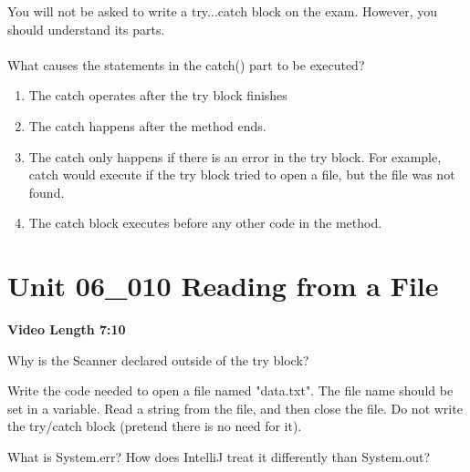 \documentclass[letterpaper,12pt]{exam}
\newcommand{\unit}{Unit 06}
\begin{document}
\begin{questions}
\begin{samepage}
    \question You will not be asked to write a try{}...catch{} block on the exam.  However, you should understand its parts.\\
    \\What causes the statements in the catch(){} part to be executed?
    \begin{enumerate}
        \item The catch operates after the try block finishes
        \vspace{5mm}
        \item The catch happens after the method ends.
        \vspace{5mm}
        \item The catch only happens if there is an error in the try{} block.  For example, catch would execute if the try block tried to open a file, but the file was not found.
        \vspace{5mm}
        \item The catch block executes before any other code in the method.
        \vspace{5mm}
       \end{enumerate}
\end{samepage}

\section*{\unit\_010 Reading from a File} %
\noindent \textbf{Video Length 7:10 }


\begin{samepage}
    \question Why is the Scanner declared outside of the try{} block?
    \vspace{5mm}
\end{samepage}

\begin{samepage}
    \question Write the code needed to open a file named "data.txt".  The file name should be set in a variable.  Read a string from the file, and then close the file.  Do not write the try/catch block (pretend there is no need for it).
    \vspace{5mm}
\end{samepage}

\begin{samepage}
    \question What is System.err?  How does IntelliJ treat it differently than System.out?
    \vspace{5mm}
\end{samepage}


\end{questions}
\end{document}
